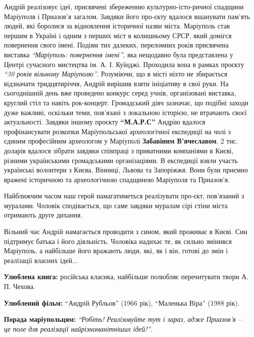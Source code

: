 Андрій реалізовує ідеї, присвячені збереженню культурно-істо\hyp{}ричної спадщини
Маріуполя і Приазов'я загалом. Завдяки його про\hyp{}єкту вдалося вшанувати пам'ять
людей, які боролися за відновлення історичної назви міста. Маріуполь став
першим в Україні і одним з перших міст в колишньому СРСР, який домігся
повернення свого імені. Подіям тих далеких, переломних років присвячена
виставка \emph{\enquote{Маріуполь: повернення імені}}, яка нещодавно була представлена у
Центрі сучасного мистецтва ім. А. І. Куїнджі. Проходила вона в рамках проєкту
\emph{\enquote{30 років вільному Маріуполю}}. Розуміючи, що в місті ніхто не збирається
відзначати тридцятиріччя, Андрій вирішив взяти ініціативу в свої руки. На
сьогоднішній день вже проведено конкурс серед учнів, організовані виставка,
круглий стіл та навіть рок-концерт. Громадський діяч зазначає, що подібні
заходи дуже важливі, оскільки теми, пов'язані з локальною історією, не
втрачають своєї актуальності. Завдяки іншому проєкту \textbf{\enquote{М.А.Р.С}} Андрію вдалося
профінансувати розкопки Маріупольської археологічної експедиції на чолі з
єдиним професійним археологом у Маріуполі \textbf{Забавіним В'ячеславом}.  2 тис.
доларів вдалося зібрати завдяки співпраці з приватними компаніями в Києві,
різними українськими громадськими організаціями. В експедиції взяли участь
українські волонтери з Києва, Вінниці, Львова та Запоріжжя. Вони були приємно
вражені історичною та археологічною спадщиною Маріуполя та Приазов'я.


Найближчим часом наш герой намагатиметься реалізувати про\hyp{}єкт, пов'язаний з
муралами. Чоловік сподівається, що саме завдяки муралам сірі стіни міста
отримають друге дихання.

Вільний час Андрій намагається проводити з сином, який проживає в Києві. Син
підтримує батька і його діяльність. Чоловіка надихає те, як сильно змінився
Маріуполь, а найбільше його вражають люди, які, як і він, готові до змін і
реалізації власних ідей...  

\textbf{Улюблена книга:} російська класика, найбільше полюбляє перечитувати твори А. П. Чехова.

\textbf{Улюблений фільм:} \enquote{Андрій Рубльов} (1966 рік), \enquote{Маленька Віра} (1988 рік).

\textbf{Порада маріупольцям:} \emph{\enquote{Робіть! Реалізовуйте тут і зараз, адже Приазов'я – це поле для реалізації найрізноманітніших ідей!}}.
